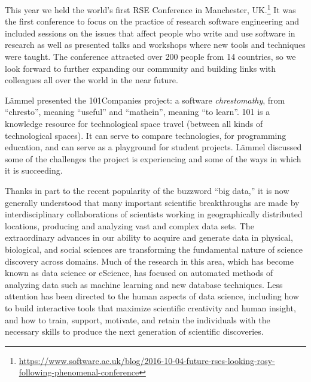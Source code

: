 \documentclass[a4paper,UKenglish]{dagrep}
\begin{document}
This year we held the world's first RSE Conference in Manchester, UK.\footnote{\url{https://www.software.ac.uk/blog/2016-10-04-future-rses-looking-rosy-following-phenomenal-conference}} It was the first conference to focus on the practice of research software engineering and included sessions on the issues that affect people who write and use software in research as well as presented talks and workshops where new tools and techniques were taught. The conference attracted over 200 people from 14 countries, so we look forward to further expanding our community and building links with colleagues all over the world in the near future.


L\"ammel presented the 101Companies project: a software \emph{chrestomathy}, from ``chresto'', meaning ``useful'' and ``mathein'', meaning ``to learn''. 101 is a knowledge resource for technological space travel (between all kinds of technological spaces). It can serve to compare technologies, for programming education, and can serve as a playground for student projects. L\"ammel discussed some of the challenges the project is experiencing and some of the ways in which it is succeeding.


Thanks in part to the recent popularity of the buzzword ``big data,'' it is now generally understood that many important scientific breakthroughs are made by interdisciplinary collaborations of scientists working in geographically distributed locations, producing and analyzing vast and complex data sets. The extraordinary advances in our ability to acquire and generate data in physical, biological, and social sciences are transforming the fundamental nature of science discovery across domains. Much of the research in this area, which has become known as data science or eScience, has focused on automated methods of analyzing data such as machine learning and new database techniques. Less attention has been directed to the human aspects of data science, including how to build interactive tools that maximize scientific creativity and human insight, and how to train, support, motivate, and retain the individuals with the necessary skills to produce the next generation of scientific discoveries.
\end{document}
